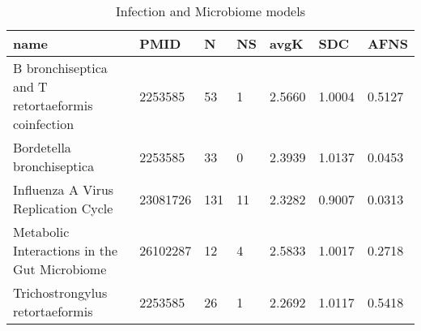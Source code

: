 \begin{table}
\caption{Infection and Microbiome models}
\label{tab:Infection_and_Microbiome}
\begin{tabular}{|p{180pt}||p{40pt}|p{25pt}|p{25pt}|p{40pt}|p{25pt}|p{25pt}|}
\toprule
name & PMID & N & NS & avgK & SDC & AFNS \\
\midrule
B bronchiseptica and T retortaeformis coinfection & 2253585 & 53 & 1 & 2.5660 & 1.0004 & 0.5127 \\
Bordetella bronchiseptica & 2253585 & 33 & 0 & 2.3939 & 1.0137 & 0.0453 \\
Influenza A Virus Replication Cycle & 23081726 & 131 & 11 & 2.3282 & 0.9007 & 0.0313 \\
Metabolic Interactions in the Gut Microbiome & 26102287 & 12 & 4 & 2.5833 & 1.0017 & 0.2718 \\
Trichostrongylus retortaeformis & 2253585 & 26 & 1 & 2.2692 & 1.0117 & 0.5418 \\
\bottomrule
\end{tabular}
\end{table}
